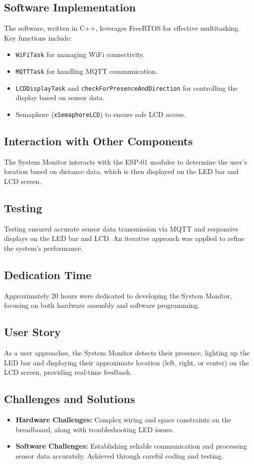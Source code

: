 \documentclass{article}
\begin{document}
\subsection{Software Implementation}
The software, written in C++, leverages FreeRTOS for effective multitasking. Key functions include:
\begin{itemize}
    \item \texttt{WiFiTask} for managing WiFi connectivity.
    \item \texttt{MQTTTask} for handling MQTT communication.
    \item \texttt{LCDDisplayTask} and \texttt{checkForPresenceAndDirection} for controlling the display based on sensor data.
    \item Semaphore (\texttt{xSemaphoreLCD}) to ensure safe LCD access.
\end{itemize}

\subsection{Interaction with Other Components}
The System Monitor interacts with the ESP-01 modules to determine the user's location based on distance data, which is then displayed on the LED bar and LCD screen.

\subsection{Testing}
Testing ensured accurate sensor data transmission via MQTT and responsive displays on the LED bar and LCD. An iterative approach was applied to refine the system's performance.

\subsection{Dedication Time}
Approximately 20 hours were dedicated to developing the System Monitor, focusing on both hardware assembly and software programming.

\subsection{User Story}
As a user approaches, the System Monitor detects their presence, lighting up the LED bar and displaying their approximate location (left, right, or center) on the LCD screen, providing real-time feedback.

\subsection{Challenges and Solutions}
\begin{itemize}
    \item \textbf{Hardware Challenges:} Complex wiring and space constraints on the breadboard, along with troubleshooting LED issues.
    \item \textbf{Software Challenges:} Establishing reliable communication and processing sensor data accurately. Achieved through careful coding and testing.
\end{itemize}
\end{document}
